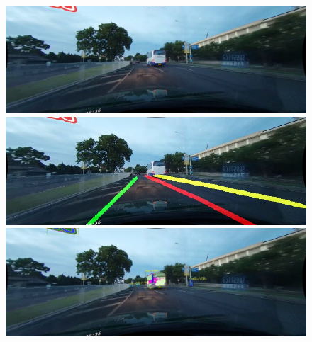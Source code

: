\documentclass[runningheads]{llncs}
\begin{document}
\begin{figure}[!htb]
	\includegraphics[width=\linewidth]{result/01290.jpg}
	\endminipage\hfill
	\includegraphics[width=\linewidth]{result/01290-lane.jpg}
	\endminipage\hfill
	\includegraphics[width=\linewidth]{result/01290-obj.jpg}
	\endminipage


\end{figure}
\end{document}
